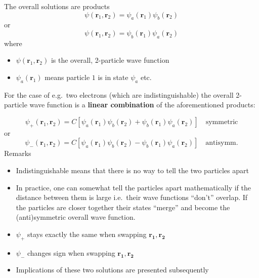 The overall solutions are products
\begin{equation*}
    \psi(\mathbf{r}_{1},\mathbf{r}_{2})=\psi_{a}(\mathbf{r}_{1})\psi_{b}(\mathbf{r}_{2})
\end{equation*}
or
\begin{equation*}
    \psi(\mathbf{r}_{1},\mathbf{r}_{2})=\psi_{b}(\mathbf{r}_{1})\psi_{a}(\mathbf{r}_{2})
\end{equation*}
where
\begin{itemize}
    \item $\psi(\mathbf{r}_{1},\mathbf{r}_{2})$ is the overall, 2-particle wave function
    \item $\psi_{a}(\mathbf{r}_{1})$ means particle $1$ is in state $\psi_{a}$ etc.
\end{itemize}

\newpar{}

For the case of e.g.\ two electrons (which are indistinguishable) the overall 2-particle wave function is a \textbf{linear combination} of the aforementioned products:

\begin{equation*}
    \psi_{+}(\mathbf{r}_{1},\mathbf{r}_{2})=C\left[\psi_{a}(\mathbf{r}_{1})\psi_{b}(\mathbf{r}_{2})+\psi_{b}(\mathbf{r}_{1})\psi_{a}(\mathbf{r}_{2})\right]\quad \mathrm{symmetric}
\end{equation*}
or
\begin{equation*}
    \psi_{-}(\mathbf{r}_{1},\mathbf{r}_{2})=C\left[\psi_{a}(\mathbf{r}_{1})\psi_{b}(\mathbf{r}_{2})-\psi_{b}(\mathbf{r}_{1})\psi_{a}(\mathbf{r}_{2})\right]\quad \mathrm{antisymm.}
\end{equation*}
Remarks
\begin{itemize}
    \item Indistinguishable means that there is no way to  tell the two particles apart
    \item In practice, one can somewhat tell the particles apart mathematically if the distance between them is large i.e.\ their wave functions ``don't'' overlap. If the particles are closer together their states ``merge'' and become the (anti)symmetric overall wave function.
    \item $\psi_{+}$ stays exactly the same when swapping $\mathbf{r_1},\mathbf{r_2}$
    \item $\psi_{-}$ changes sign when swapping $\mathbf{r_1},\mathbf{r_2}$
    \item Implications of these two solutions are presented subsequently
\end{itemize}

